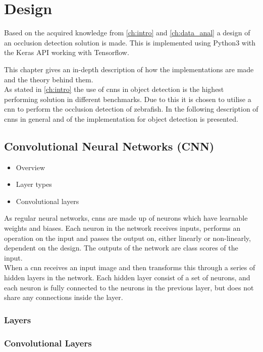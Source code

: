\graphicspath{{figures/design/}}
\chapter{Design}\label{ch:design}
Based on the acquired knowledge from \autoref{ch:intro} and \autoref{ch:data_anal} a design of an occlusion detection solution is made. This is implemented using Python3 with the Keras API working with Tensorflow.

This chapter gives an in-depth description of how the implementations are made and the theory behind them.\\

As stated in \autoref{ch:intro} the use of \gls{cnn}s in object detection is the highest performing solution in different benchmarks. Due to this it is chosen to utilise a \gls{cnn} to perform the occlusion detection of zebrafish. In the following description of \gls{cnn}s in general and of the implementation for object detection is presented.

\section{Convolutional Neural Networks (CNN)}
\begin{itemize}
	\item Overview
	\item Layer types
	\item Convolutional layers
\end{itemize}

As regular neural networks, \gls{cnn}s are made up of neurons which have learnable weights and biases. Each neuron in the network receives inputs, performs an operation on the input and passes the output on, either linearly or non-linearly, dependent on the design. The outputs of the network are class scores of the input.\\

When a \gls{cnn} receives an input image and then transforms this through a series of hidden layers in the network. Each hidden layer consist of a set of neurons, and each neuron is fully connected to the neurons in the previous layer, but does not share any connections inside the layer.

\subsection{Layers}

\subsection{Convolutional Layers}


